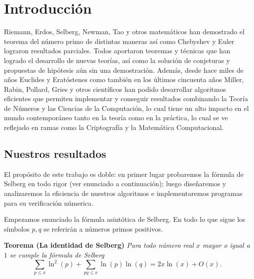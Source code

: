\setlength{\headheight}{14.61858pt}
\pagestyle{fancy}

\chapter[Introducci\'on]
{Introducci\'on}
\label{ch:introduction}

\vspace*{1cm}

Riemann, Erdos, Selberg, Newman, Tao y otros matem\'aticos han demostrado el
teorema del n\'umero primo de distintas maneras as\'i como Chebyshev y Euler
lograron resultados parciales.
Todos aportaron teoremas y t\'ecnicas que han
logrado el desarrollo de nuevas teor\'ias, as\'i como la soluci\'on
de conjeturas y propuestas de hip\'otesis a\'un sin una demostraci\'on.
Adem\'as, desde hace miles de a\~nos Euclides y Erat\'ostenes
como tambi\'en en los \'ultimos cincuenta a\~nos Miller, Rabin, Pollard, Gries
y otros cient\'ificos han podido desarrollar algoritmos eficientes que permiten
implementar y conseguir resultados combinando la Teor\'ia de N\'umeros y
las Ciencias de la Computaci\'on, lo cual tiene un alto impacto en
el mundo contempor\'aneo tanto en la teor\'ia como en la pr\'actica,
lo cual se ve reflejado en ramas como la Criptograf\'ia y
la Matem\'atica Computacional.
 
\section{Nuestros resultados}
El prop\'osito de este trabajo es doble: 
en primer lugar probaremos la f\'ormula de Selberg en todo rigor
(ver enunciado a continuaci\'on); 
luego diseñaremos y analizaremos la eficiencia de nuestros algoritmos e
implementaremos programas para su verificaci\'on n\'umerica.

\bigskip

Empezamos enunciado la f\'ormula asint\'otica de Selberg. 
En todo lo que sigue los s\'imbolos \(p, q\) se referir\'an a
n\'umeros primos positivos.

\bigskip

\noindent
\textbf{Teorema (La identidad de Selberg)}
\textit{Para todo n\'umero real \(x\) mayor o igual a \(1\)
se cumple la f\'ormula de Selberg}
\[
  \sum_{p \leq x} \ln^2(p) + \sum_{pq \leq x} \ln(p) \ln(q) = 2x\ln(x) + O(x).
\]


